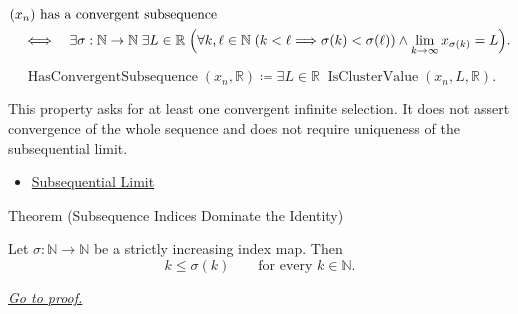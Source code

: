 \begin{remark*}
\[
\begin{aligned}
&(x_n)\text{ has a convergent subsequence}\\
&\quad\Longleftrightarrow\quad
\exists \sigma:\mathbb{N}\to\mathbb{N}\;\exists L\in\mathbb{R}\;
\Bigl(
  \forall k,\ell\in\mathbb{N}\;(k<\ell\Longrightarrow \sigma(k)<\sigma(\ell))
  \land
  \lim_{k\to\infty}x_{\sigma(k)}=L
\Bigr).
\end{aligned}
\]
\end{remark*}

\begin{remark*}
\[
\operatorname{HasConvergentSubsequence}(x_n,\mathbb{R})
\coloneqq
\exists L\in\mathbb{R}\;\operatorname{IsClusterValue}(x_n,L,\mathbb{R}).
\]
\end{remark*}

\begin{remark*}[Interpretation]
This property asks for at least one convergent infinite selection. It does not
assert convergence of the whole sequence and does not require uniqueness of
the subsequential limit.
\end{remark*}

\begin{dependencies}
\begin{itemize}
  \item \hyperref[def:subsequential-limit]{Subsequential Limit}
\end{itemize}
\end{dependencies}


\begin{theorembox}{Theorem (Subsequence Indices Dominate the Identity)}
\begin{theorem}
\label{thm:subsequence-indices-dominate-identity}
Let $\sigma:\mathbb{N}\to\mathbb{N}$ be a strictly increasing index map.
Then
\[
  k\le \sigma(k)
  \qquad
  \text{for every } k\in\mathbb{N}.
\]

\smallskip
\noindent
\hyperref[prf:subsequence-indices-dominate-identity]{\textit{Go to proof.}}
\end{theorem}
\end{theorembox}

